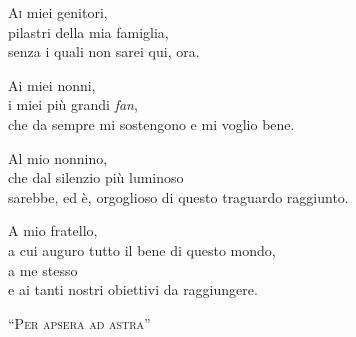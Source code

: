
\begin{center}
	\parbox{0.75\textwidth}{
		\lettrine[lines = 3, slope = 0.6em, findent = -0.6em, nindent = 0.6em]{\textcolor{school_red}{A}}{i} miei genitori,\\	
		pilastri della mia famiglia,\\	
		senza i quali non sarei qui, ora.
		
		\medskip
		
		Ai miei nonni,\\
		i miei più grandi \textit{fan},\\
		che da sempre mi sostengono e mi voglio bene.
		
		\medskip
		
		Al mio nonnino,\\
		che dal silenzio più luminoso\\
		sarebbe, ed è, orgoglioso di questo traguardo raggiunto.
		
		\medskip
		
		A mio fratello,\\
		a cui auguro tutto il bene di questo mondo,\\
		a me stesso\\
		e ai tanti nostri obiettivi da raggiungere.
		
		\bigskip
	
		\begin{flushright}
			\textsc{``Per apsera ad astra''}
		\end{flushright}
	}
\end{center}


